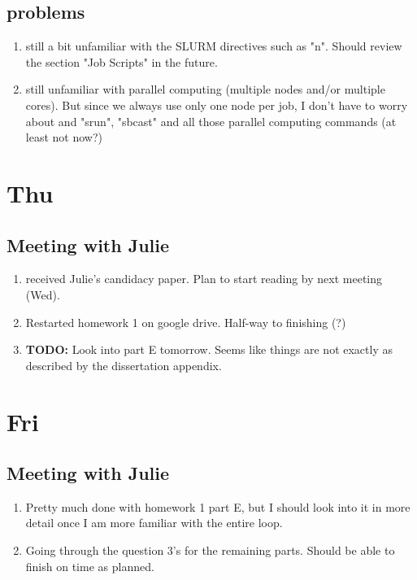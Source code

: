 \documentclass[12pt,letterpaper]{article}
\begin{document}
\subsection{problems}
\begin{enumerate}
  \item still a bit unfamiliar with the SLURM directives such as "n". Should review
    the section "Job Scripts" in the future.
  \item still unfamiliar with parallel computing (multiple nodes and/or multiple cores).
    But since we always use only one node per job, I don't have to worry about
    and "srun", "sbcast" and all those parallel computing commands
    (at least not now?)
  
\end{enumerate}


\section{Thu}
\subsection{Meeting with Julie}
\begin{enumerate}
  \item received Julie's candidacy paper. Plan to start reading by next meeting (Wed).
  \item Restarted homework 1 on google drive. Half-way to finishing (?)
  \item \textbf{TODO:} Look into part E tomorrow. Seems like things are not exactly as
    described by the dissertation appendix.
\end{enumerate}



\section{Fri}
\subsection{Meeting with Julie}
\begin{enumerate}
  \item Pretty much done with homework 1 part E, but I should look into it in more
    detail once I am more familiar with the entire loop.
  \item Going through the question 3's for the remaining parts. Should be able to 
    finish on time as planned.
\end{enumerate}
\end{document}
